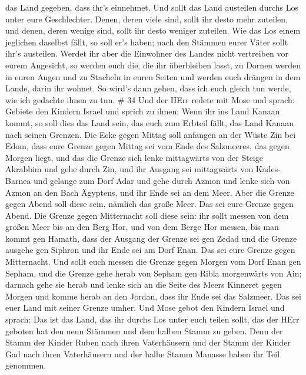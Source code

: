das Land gegeben, dass ihr's einnehmet.  Und sollt das Land
austeilen durchs Los unter eure Geschlechter. Denen, deren viele sind,
sollt ihr desto mehr zuteilen, und denen, deren wenige sind, sollt ihr
desto weniger zuteilen. Wie das Los einem jeglichen daselbst fällt, so
soll er's haben; nach den Stämmen eurer Väter sollt ihr's austeilen.
 Werdet ihr aber die Einwohner des Landes nicht vertreiben
vor eurem Angesicht, so werden euch die, die ihr überbleiben lasst, zu
Dornen werden in euren Augen und zu Stacheln in euren Seiten und werden
euch drängen in dem Lande, darin ihr wohnet.  So wird's
dann gehen, dass ich euch gleich tun werde, wie ich gedachte ihnen zu
tun. \# 34  Und der HErr redete mit Mose und sprach:
 Gebiete den Kindern Israel und sprich zu ihnen: Wenn ihr
ins Land Kanaan kommt, so soll dies das Land sein, das euch zum Erbteil
fällt, das Land Kanaan nach seinen Grenzen.  Die Ecke gegen
Mittag soll anfangen an der Wüste Zin bei Edom, dass eure Grenze gegen
Mittag sei vom Ende des Salzmeeres, das gegen Morgen liegt, 
und das die Grenze sich lenke mittagwärts von der Steige Akrabbim und
gehe durch Zin, und ihr Ausgang sei mittagwärts von Kades-Barnea und
gelange zum Dorf Adar und gehe durch Azmon  und lenke sich
von Azmon an den Bach Ägyptens, und ihr Ende sei an dem Meer.
 Aber die Grenze gegen Abend soll diese sein, nämlich das
große Meer. Das sei eure Grenze gegen Abend.  Die Grenze
gegen Mitternacht soll diese sein: ihr sollt messen von dem großen Meer
bis an den Berg Hor,  und von dem Berge Hor messen, bis man
kommt gen Hamath, dass der Ausgang der Grenze sei gen Zedad 
und die Grenze ausgehe gen Siphron und ihr Ende sei am Dorf Enan. Das
sei eure Grenze gegen Mitternacht.  Und sollt euch messen
die Grenze gegen Morgen vom Dorf Enan gen Sepham,  und die
Grenze gehe herab von Sepham gen Ribla morgenwärts von Ain; darnach gehe
sie herab und lenke sich an die Seite des Meers Kinneret gegen Morgen
 und komme herab an den Jordan, dass ihr Ende sei das
Salzmeer. Das sei euer Land mit seiner Grenze umher.  Und
Mose gebot den Kindern Israel und sprach: Das ist das Land, das ihr
durchs Los unter euch teilen sollt, das der HErr geboten hat den neun
Stämmen und dem halben Stamm zu geben.  Denn der Stamm der
Kinder Ruben nach ihren Vaterhäusern und der Stamm der Kinder Gad nach
ihren Vaterhäusern und der halbe Stamm Manasse haben ihr Teil genommen.
